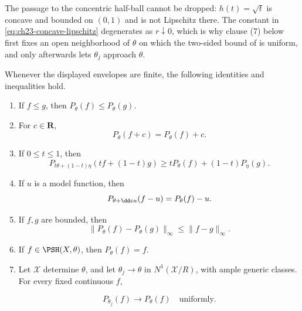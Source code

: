 \begin{remark}
\label{rem:ch23-concave-lipschitz-sharp}
The passage to the concentric half-ball cannot be dropped: \(h(t)=\sqrt t\)
is concave and bounded on \((0,1)\) and is not Lipschitz there.  The constant
in \eqref{eq:ch23-concave-lipschitz} degenerates as \(r\downarrow0\), which
is why clause (7) below first fixes an open neighborhood of \(\theta\) on
which the two-sided bound of  is uniform,
and only afterwards lets \(\theta_j\) approach \(\theta\).
\end{remark}

\begin{proposition}\label{prop:ch23-formal-envelope-calculus}
Whenever the displayed envelopes are finite, the following identities and
inequalities hold.

\begin{enumerate}
\item If \(f\leq g\), then \(P_\theta(f)\leq P_\theta(g)\).
\item For \(c\in\mathbf R\),
\begin{equation}\label{eq:ch23-translation}
                         P_\theta(f+c)=P_\theta(f)+c.
\end{equation}

\item If \(0\leq t\leq1\), then
\begin{equation}\label{eq:ch23-joint-concavity}
 P_{t\theta+(1-t)\eta}(tf+(1-t)g)
 \geq tP_\theta(f)+(1-t)P_\eta(g).
\end{equation}

\item If \(u\) is a model function, then
\begin{equation}\label{eq:ch23-reference-change}
 P_{\theta+\ddc u}(f-u)=P_\theta(f)-u.
\end{equation}

\item If \(f,g\) are bounded, then
\begin{equation}\label{eq:ch23-envelope-contraction}
       \|P_\theta(f)-P_\theta(g)\|_\infty
       \leq\|f-g\|_\infty.
\end{equation}

\item If \(f\in\PSH(X,\theta)\), then \(P_\theta(f)=f\).
\item Let \(\mathcal X\) determine \(\theta\), and let
\(\theta_j\to\theta\) in \(N^1(\mathcal X/R)\), with ample generic classes.
For every fixed continuous \(f\),

\[
                       P_{\theta_j}(f)\longrightarrow P_\theta(f)
                       \quad\text{uniformly}.
\]
\end{enumerate}
\end{proposition}

